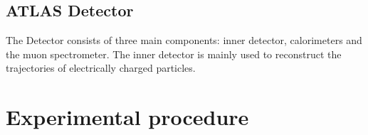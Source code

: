 \documentclass[12pt, a4paper, bibliography=totoc]{scrreprt}
\begin{document}
\section{ATLAS Detector}
The Detector consists of three main components: inner detector, calorimeters and the muon spectrometer.
The inner detector is mainly used to reconstruct the trajectories of electrically charged particles.



\chapter{Experimental procedure}


\nocite{*}
\appendix
\printbibliography
\end{document}
